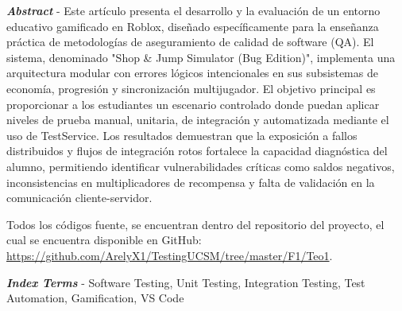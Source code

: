 \textbf{\textit{Abstract}} - Este artículo presenta el desarrollo y la evaluación de un entorno educativo gamificado en Roblox, diseñado específicamente para la enseñanza práctica de metodologías de aseguramiento de calidad de software (QA). El sistema, denominado "Shop \& Jump Simulator (Bug Edition)", implementa una arquitectura modular con errores lógicos intencionales en sus subsistemas de economía, progresión y sincronización multijugador. El objetivo principal es proporcionar a los estudiantes un escenario controlado donde puedan aplicar niveles de prueba manual, unitaria, de integración y automatizada mediante el uso de TestService. Los resultados demuestran que la exposición a fallos distribuidos y flujos de integración rotos fortalece la capacidad diagnóstica del alumno, permitiendo identificar vulnerabilidades críticas como saldos negativos, inconsistencias en multiplicadores de recompensa y falta de validación en la comunicación cliente-servidor.

Todos los códigos fuente, se encuentran dentro del repositorio del proyecto, el cual se encuentra disponible en GitHub: \url{https://github.com/ArelyX1/TestingUCSM/tree/master/F1/Teo1}.  
\vspace{0.5em}

\textbf{\textit{Index Terms}} - Software Testing, Unit Testing, Integration Testing, Test Automation, Gamification, VS Code